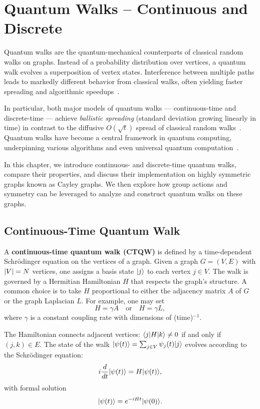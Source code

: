 \documentclass[12pt]{report}
\begin{document}
\chapter{Quantum Walks -- Continuous and Discrete}\label{chap:quantum_walks}

Quantum walks are the quantum-mechanical counterparts of classical random walks on graphs. Instead of a probability distribution over vertices, a quantum walk evolves a superposition of vertex states. Interference between multiple paths leads to markedly different behavior from classical walks, often yielding faster spreading and algorithmic speedups~\cite{Aharonov2001}.

In particular, both major models of quantum walks --- continuous-time and discrete-time --- achieve \emph{ballistic spreading} (standard deviation growing linearly in time) in contrast to the diffusive $O(\sqrt{t})$ spread of classical random walks~\cite{Kempe2003}. Quantum walks have become a central framework in quantum computing, underpinning various algorithms and even universal quantum computation~\cite{Childs2009,Ambainis2003}.

In this chapter, we introduce continuous- and discrete-time quantum walks, compare their properties, and discuss their implementation on highly symmetric graphs known as Cayley graphs. We then explore how group actions and symmetry can be leveraged to analyze and construct quantum walks on these graphs.



\section{Continuous-Time Quantum Walk}


A \textbf{continuous-time quantum walk (CTQW)} is defined by a time-dependent Schrödinger equation on the vertices of a graph. Given a graph $G=(V,E)$ with $\lvert V\rvert=N$ vertices, one assigns a basis state $\lvert j\rangle$ to each vertex $j \in V$. The walk is governed by a Hermitian Hamiltonian $H$ that respects the graph's structure. A common choice is to take $H$ proportional to either the adjacency matrix $A$ of $G$ or the graph Laplacian $L$. For example, one may set
\[
H = \gamma A \quad \text{or} \quad H = \gamma L,
\]
where $\gamma$ is a constant coupling rate with dimensions of (time)$^{-1}$.

The Hamiltonian connects adjacent vertices: $\langle j\rvert H\lvert k\rangle \neq 0$ if and only if $(j,k) \in E$. The state of the walk $\lvert\psi(t)\rangle = \sum_{j \in V} \psi_j(t) \lvert j\rangle$ evolves according to the Schrödinger equation:
\[
i \frac{d}{dt} \lvert\psi(t)\rangle = H \lvert\psi(t)\rangle,
\]
with formal solution
\[
\lvert\psi(t)\rangle = e^{-iHt} \lvert\psi(0)\rangle.
\]
\end{document}
